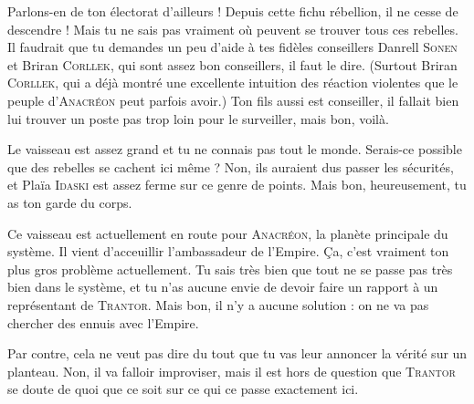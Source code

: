 \documentclass{article}
\begin{document}
{{Parlons-en de ton électorat d’ailleurs !
Depuis cette fichu rébellion, il ne cesse de descendre !
Mais tu ne sais pas vraiment où peuvent se trouver tous ces rebelles.
Il faudrait que tu demandes un peu d’aide à tes fidèles conseillers Danrell \textsc{Sonen} et Briran \textsc{Corllek}, qui sont assez bon conseillers, il faut le dire.
(Surtout Briran \textsc{Corllek}, qui a déjà montré une excellente intuition des réaction violentes que le peuple d’\textsc{Anacréon} peut parfois avoir.)
Ton fils aussi est conseiller, il fallait bien lui trouver un poste pas trop loin pour le surveiller, mais bon, voilà.

Le vaisseau est assez grand et tu ne connais pas tout le monde.
Serais-ce possible que des rebelles se cachent ici même ?
Non, ils auraient dus passer les sécurités, et Plaïa \textsc{Idaski} est assez ferme sur ce genre de points.
Mais bon, heureusement, tu as ton garde du corps.

Ce vaisseau est actuellement en route pour \textsc{Anacréon}, la planète principale du système.
Il vient d’acceuillir l’ambassadeur de l’Empire.
Ça, c’est vraiment ton plus gros problème actuellement.
Tu sais très bien que tout ne se passe pas très bien dans le système, et tu n’as aucune envie de devoir faire un rapport à un représentant de \textsc{Trantor}.
Mais bon, il n’y a aucune solution : on ne va pas chercher des ennuis avec l’Empire.

Par contre, cela ne veut pas dire du tout que tu vas leur annoncer la vérité sur un planteau.
Non, il va falloir improviser, mais il est hors de question que \textsc{Trantor} se doute de quoi que ce soit sur ce qui ce passe exactement ici.
}
}
\end{document}
